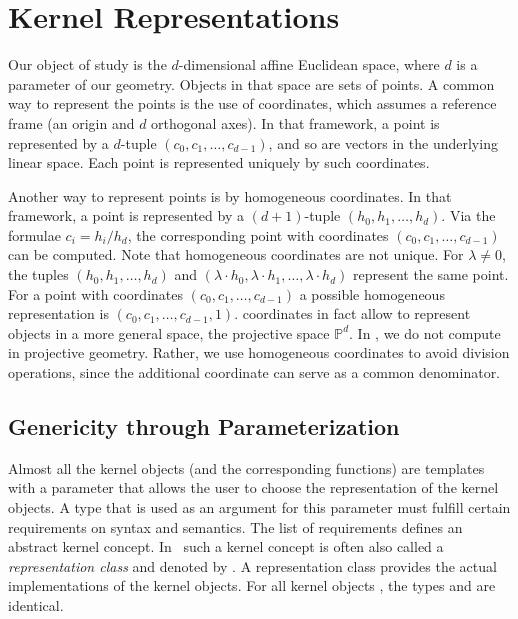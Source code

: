\section{Kernel Representations}

Our object of study is the $d$-dimensional affine Euclidean space,
where $d$ is a parameter of our geometry.  Objects in that space are
sets of points. A common way to represent the points is the use of
 coordinates, which assumes a reference
frame (an origin and $d$ orthogonal axes).  In that framework, a point
is represented by a $d$-tuple $(c_0,c_1,\ldots,c_{d-1})$,
and so are vectors in the underlying linear space. Each point is
represented uniquely by such 
coordinates.

Another way to represent points is by homogeneous coordinates. In that
framework, a point is represented by a $(d+1)$-tuple $(h_0,h_1,\ldots,h_d)$.
Via the formulae $c_i = h_i/h_d$,
the corresponding point with  coordinates
$(c_0,c_1,\ldots,c_{d-1})$
can be computed.  Note that homogeneous coordinates are not unique. 
For $\lambda\ne 0$, the tuples $(h_0,h_1,\ldots,h_d)$ and 
$(\lambda\cdot h_0,\lambda\cdot h_1,\ldots,\lambda\cdot h_d)$
represent the same point.
For a point with  coordinates 
$(c_0,c_1,\ldots,c_{d-1})$ a
possible homogeneous representation is
$(c_0,c_1,\ldots,c_{d-1},1)$.
 coordinates in fact allow to represent 
objects in a more general space, the projective space $\mathbb{P}^d$.
In \cgal, we do not compute in projective geometry. Rather, we use 
homogeneous coordinates to avoid division operations,
since the additional coordinate can serve as a common denominator.

\subsection{Genericity through Parameterization}
Almost all the kernel objects (and the corresponding functions) are
templates with a parameter that allows the user to choose the
representation of the kernel objects. A type that is used as an
argument for this parameter must fulfill certain requirements on
syntax and semantics. The list of requirements defines an abstract
kernel concept. In \cgal\ such a kernel concept is often also called a
\emph{representation class} and denoted by . A representation
class provides the actual implementations of the kernel objects.  For
all kernel objects , the types
 and  are identical.

